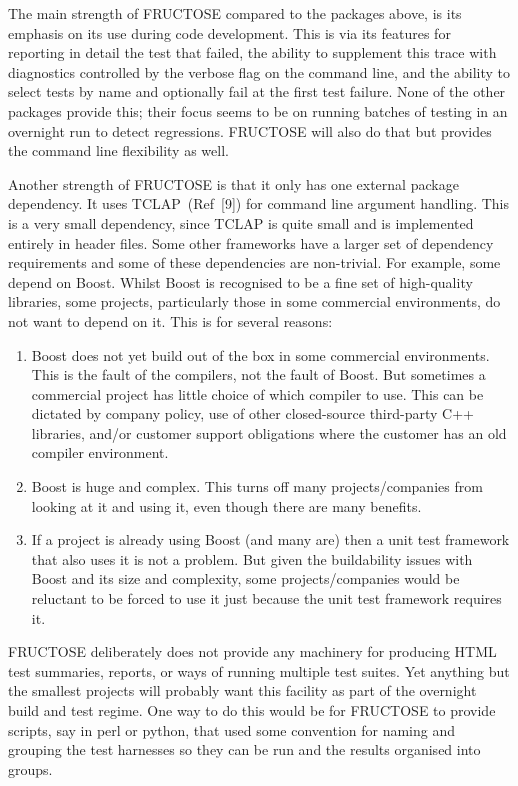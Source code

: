\documentclass{book}
\begin{document}

The main strength of FRUCTOSE compared to the packages above,
is its emphasis on its use during code development.
This is via its features for reporting in detail the test that failed,
the ability to supplement this trace with diagnostics
controlled by the verbose flag on the command line,
and the ability to select tests by name and optionally
fail at the first test failure.
None of the other packages provide this; their focus seems
to be on running batches of testing in an overnight run
to detect regressions. FRUCTOSE will also do that but provides
the command line flexibility as well.

Another strength of FRUCTOSE is that it only has one
external package dependency. It uses TCLAP~(Ref~[9])
for command line argument handling. This is a very small dependency,
since TCLAP is quite small and is implemented entirely in header files.
Some other frameworks have a larger set of dependency requirements
and some of these dependencies are non-trivial.
For example, some depend on Boost. Whilst Boost is recognised
to be a fine set of high-quality libraries, 
some projects, particularly those in some commercial
environments, do not want to depend on it.
This is for several reasons:
\begin{enumerate}
\item Boost does not yet build out of the box in some
commercial environments. This is the fault of the compilers,
not the fault of Boost. But sometimes a commercial project has
little choice of which compiler to use. This can be dictated by
company policy, use of other closed-source third-party C++
libraries, and/or customer support obligations where the customer
has an old compiler environment.

\item Boost is huge and complex. 
This turns off many projects/companies from looking at it and using it,
even though there are many benefits.

\item If a project is already using Boost (and many are)
then a unit test framework that also uses it is not a problem.
But given the buildability issues with Boost and its size
and complexity, some projects/companies would be reluctant to
be forced to use it just because the unit test framework
requires it. 
\end{enumerate}


FRUCTOSE deliberately does not provide any machinery for
producing HTML test summaries, reports, or ways of running
multiple test suites. Yet anything but the smallest projects
will probably want this facility as part of the overnight
build and test regime. One way to do this would be for
FRUCTOSE to provide scripts, say in perl or python,
that used some convention for naming and grouping
the test harnesses so they can be run and the results organised
into groups.
\end{document}
